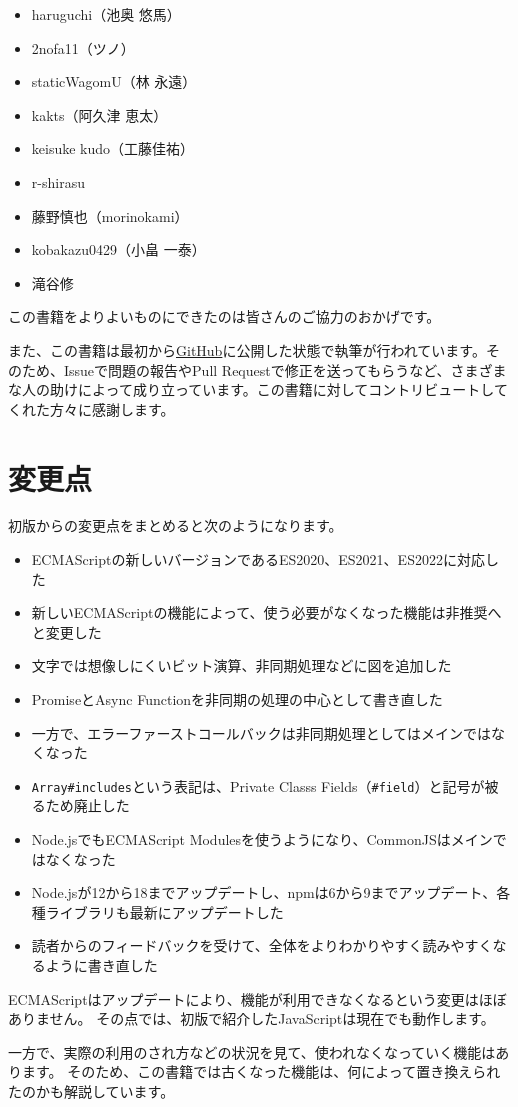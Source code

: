 \begin{itemize}
\item haruguchi（池奥 悠馬）
\item 2nofa11（ツノ）
\item staticWagomU（林 永遠）
\item kakts（阿久津 恵太）
\item keisuke kudo（工藤佳祐）
\item r-shirasu
\item 藤野慎也（morinokami）
\item kobakazu0429（小畠 一泰）
\item 滝谷修
\end{itemize}

この書籍をよりよいものにできたのは皆さんのご協力のおかげです。

また、この書籍は最初から\href{https://github.com/asciidwango/js-primer}{GitHub}に公開した状態で執筆が行われています。そのため、Issueで問題の報告やPull Requestで修正を送ってもらうなど、さまざまな人の助けによって成り立っています。この書籍に対してコントリビュートしてくれた方々に感謝します。

\hypertarget{changelog}{%
\section*{変更点}\label{changelog}}

初版からの変更点をまとめると次のようになります。

\begin{itemize}
\item ECMAScriptの新しいバージョンであるES2020、ES2021、ES2022に対応した
\item 新しいECMAScriptの機能によって、使う必要がなくなった機能は非推奨へと変更した
\item 文字では想像しにくいビット演算、非同期処理などに図を追加した
\item PromiseとAsync Functionを非同期の処理の中心として書き直した
\item 一方で、エラーファーストコールバックは非同期処理としてはメインではなくなった
\item \texttt{Array\#includes}という表記は、Private Classs Fields（\texttt{\#field}）と記号が被るため廃止した
\item Node.jsでもECMAScript Modulesを使うようになり、CommonJSはメインではなくなった
\item Node.jsが12から18までアップデートし、npmは6から9までアップデート、各種ライブラリも最新にアップデートした
\item 読者からのフィードバックを受けて、全体をよりわかりやすく読みやすくなるように書き直した
\end{itemize}

ECMAScriptはアップデートにより、機能が利用できなくなるという変更はほぼありません。
その点では、初版で紹介したJavaScriptは現在でも動作します。

一方で、実際の利用のされ方などの状況を見て、使われなくなっていく機能はあります。
そのため、この書籍では古くなった機能は、何によって置き換えられたのかも解説しています。
